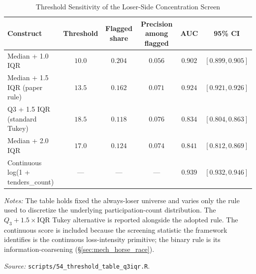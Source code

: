 \begin{table}[htbp]
\centering
\caption{Threshold Sensitivity of the Loser-Side Concentration Screen}
\label{tab:threshold_q3iqr}
\begin{threeparttable}
\small
\begin{tabular}{lccccc}
\toprule
Construct & Threshold & Flagged share & Precision among flagged & AUC & 95\% CI \\
\midrule
Median + 1.0 IQR & $10.0$ & $0.204$ & $0.056$ & $0.902$ & $[0.899, 0.905]$ \\
Median + 1.5 IQR (paper rule) & $13.5$ & $0.162$ & $0.071$ & $0.924$ & $[0.921, 0.926]$ \\
Q3 + 1.5 IQR (standard Tukey) & $18.5$ & $0.118$ & $0.076$ & $0.834$ & $[0.804, 0.863]$ \\
Median + 2.0 IQR & $17.0$ & $0.124$ & $0.074$ & $0.841$ & $[0.812, 0.869]$ \\
Continuous log(1 + tenders\_count) & --- & --- & --- & $0.939$ & $[0.932, 0.946]$ \\
\bottomrule
\end{tabular}
\begin{tablenotes}
\small
\item \textit{Notes:} The table holds fixed the always-loser universe
and varies only the rule used to discretize the underlying
participation-count distribution. The $Q_3 + 1.5\times\mathrm{IQR}$
Tukey alternative is reported alongside the adopted rule. The
continuous score is included because the screening statistic the
framework identifies is the continuous loss-intensity primitive; the
binary rule is its information-coarsening (\S\ref{sec:mech_horse_race}).
\item \textit{Source:} \texttt{scripts/54\_threshold\_table\_q3iqr.R}.
\end{tablenotes}
\end{threeparttable}
\end{table}
